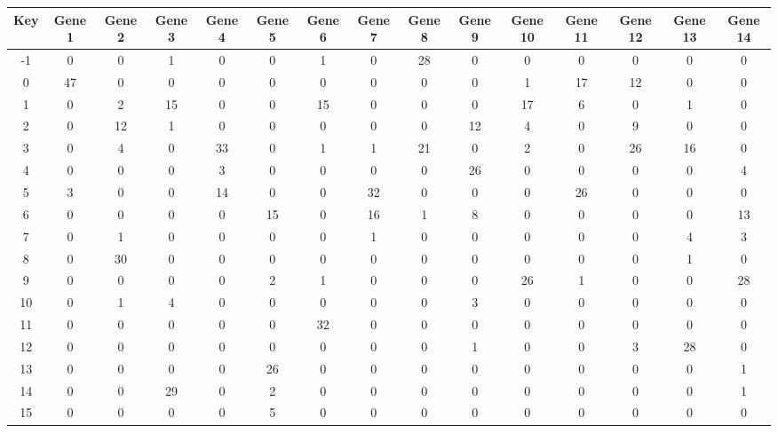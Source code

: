 \begin{tabular}{|c|c|c|c|c|c|c|c|c|c|c|c|c|c|c|}
\hline
Key & Gene 1 & Gene 2 & Gene 3 & Gene 4 & Gene 5 & Gene 6 & Gene 7 & Gene 8 & Gene 9 & Gene 10 & Gene 11 & Gene 12 & Gene 13 & Gene 14 \\
\hline
-1 & 0 & 0 & 1 & 0 & 0 & 1 & 0 & 28 & 0 & 0 & 0 & 0 & 0 & 0 \\
0 & 47 & 0 & 0 & 0 & 0 & 0 & 0 & 0 & 0 & 1 & 17 & 12 & 0 & 0 \\
1 & 0 & 2 & 15 & 0 & 0 & 15 & 0 & 0 & 0 & 17 & 6 & 0 & 1 & 0 \\
2 & 0 & 12 & 1 & 0 & 0 & 0 & 0 & 0 & 12 & 4 & 0 & 9 & 0 & 0 \\
3 & 0 & 4 & 0 & 33 & 0 & 1 & 1 & 21 & 0 & 2 & 0 & 26 & 16 & 0 \\
4 & 0 & 0 & 0 & 3 & 0 & 0 & 0 & 0 & 26 & 0 & 0 & 0 & 0 & 4 \\
5 & 3 & 0 & 0 & 14 & 0 & 0 & 32 & 0 & 0 & 0 & 26 & 0 & 0 & 0 \\
6 & 0 & 0 & 0 & 0 & 15 & 0 & 16 & 1 & 8 & 0 & 0 & 0 & 0 & 13 \\
7 & 0 & 1 & 0 & 0 & 0 & 0 & 1 & 0 & 0 & 0 & 0 & 0 & 4 & 3 \\
8 & 0 & 30 & 0 & 0 & 0 & 0 & 0 & 0 & 0 & 0 & 0 & 0 & 1 & 0 \\
9 & 0 & 0 & 0 & 0 & 2 & 1 & 0 & 0 & 0 & 26 & 1 & 0 & 0 & 28 \\
10 & 0 & 1 & 4 & 0 & 0 & 0 & 0 & 0 & 3 & 0 & 0 & 0 & 0 & 0 \\
11 & 0 & 0 & 0 & 0 & 0 & 32 & 0 & 0 & 0 & 0 & 0 & 0 & 0 & 0 \\
12 & 0 & 0 & 0 & 0 & 0 & 0 & 0 & 0 & 1 & 0 & 0 & 3 & 28 & 0 \\
13 & 0 & 0 & 0 & 0 & 26 & 0 & 0 & 0 & 0 & 0 & 0 & 0 & 0 & 1 \\
14 & 0 & 0 & 29 & 0 & 2 & 0 & 0 & 0 & 0 & 0 & 0 & 0 & 0 & 1 \\
15 & 0 & 0 & 0 & 0 & 5 & 0 & 0 & 0 & 0 & 0 & 0 & 0 & 0 & 0 \\
\hline
\end{tabular}